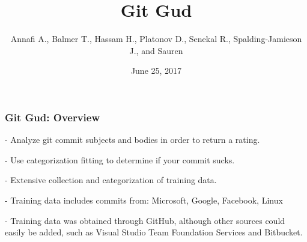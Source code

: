 \documentclass{beamer}
\title{\Large \bf Git Gud}
\author{Annafi A., Balmer T., Hassam H., Platonov D., Senekal R., Spalding-Jamieson J., and Sauren}
\institute{Students of UBC, UVic, and SFU} %
\date{June 25, 2017}
\begin{document}
\begin{frame}
	\titlepage
\end{frame}

\begin{frame}

\frametitle{Git Gud: Overview}
	\begin{description}
		\item{-} Analyze git commit subjects and bodies in order to return a rating.
		\item{-} Use categorization fitting to determine if your commit sucks.
		\item{-} Extensive collection and categorization of training data.
		\item{-} Training data includes commits from: Microsoft, Google, Facebook, Linux
		\item{-} Training data was obtained through GitHub, although other sources could easily be added,
			such as Visual Studio Team Foundation Services and Bitbucket.
	\end{description}

\end{frame}
\end{document}
